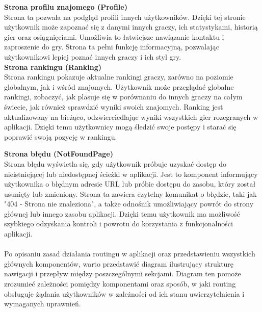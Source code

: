 \documentclass[12pt,a4paper]{article}
\begin{document}
\noindent \textbf{Strona profilu znajomego (Profile)}\\
Strona ta pozwala na podgląd profili innych użytkowników. Dzięki tej stronie użytkownik może zapoznać się z danymi innych graczy, ich statystykami, historią gier oraz osiągnięciami. Umożliwia to łatwiejsze nawiązanie kontaktu i zaproszenie do gry. Strona ta pełni funkcję informacyjną, pozwalając użytkownikowi lepiej poznać innych graczy i ich styl gry.
\\

\noindent \textbf{Strona rankingu (Ranking)}\\
Strona rankingu pokazuje aktualne rankingi graczy, zarówno na poziomie globalnym, jak i wśród znajomych. Użytkownik może przeglądać globalne rankingi, zobaczyć, jak plasuje się w porównaniu do innych graczy na całym świecie, jak również sprawdzić wyniki swoich znajomych. Ranking jest aktualizowany na bieżąco, odzwierciedlając wyniki wszystkich gier rozegranych w aplikacji. Dzięki temu użytkownicy mogą śledzić swoje postępy i starać się poprawić swoją pozycję w rankingu.

\newpage

\noindent \textbf{Strona błędu (NotFoundPage)}\\
Strona błędu wyświetla się, gdy użytkownik próbuje uzyskać dostęp do nieistniejącej lub niedostępnej ścieżki w aplikacji. Jest to komponent informujący użytkownika o błędnym adresie URL lub próbie dostępu do zasobu, który został usunięty lub zmieniony. Strona ta zawiera czytelny komunikat o błędzie, taki jak "404 - Strona nie znaleziona", a także odnośnik umożliwiający powrót do strony głównej lub innego zasobu aplikacji. Dzięki temu użytkownik ma możliwość szybkiego odzyskania kontroli i powrotu do korzystania z funkcjonalności aplikacji.
\\\\
Po opisaniu zasad działania routingu w aplikacji oraz przedstawieniu wszystkich głównych komponentów, warto przedstawić diagram ilustrujący strukturę nawigacji i przepływ między poszczególnymi sekcjami. Diagram ten pomoże zrozumieć zależności pomiędzy komponentami oraz sposób, w jaki routing obsługuje żądania użytkowników w zależności od ich stanu uwierzytelnienia i wymaganych uprawnień.
\end{document}
